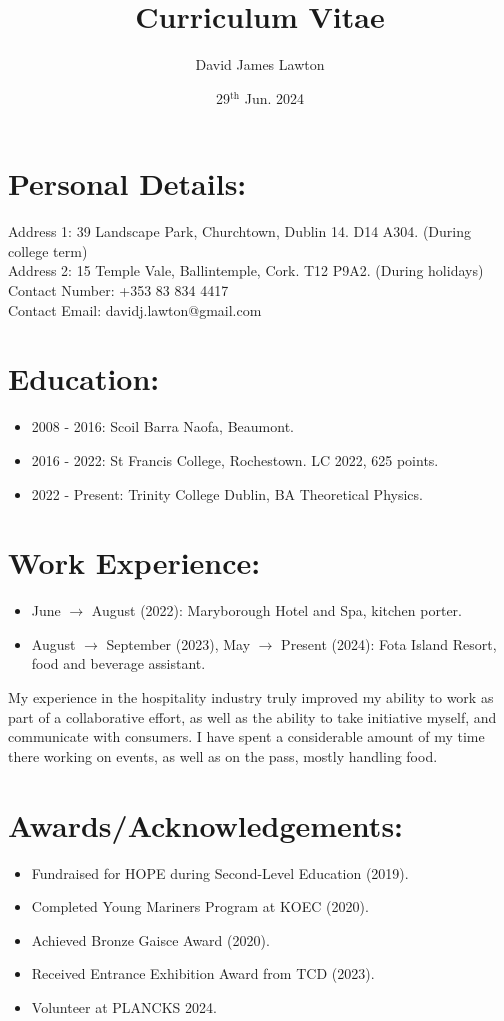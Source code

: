 \documentclass{article}
\title{Curriculum Vitae}
\author{David James Lawton}
\date{29$^\text{th}$ Jun. 2024}
\begin{document}
\maketitle

\section{Personal Details:}
Address 1: 39 Landscape Park, Churchtown, Dublin 14. D14 A304. (During college term)\\
Address 2: 15 Temple Vale, Ballintemple, Cork. T12 P9A2. (During holidays)\\
Contact Number: +353 83 834 4417\\
Contact Email: davidj.lawton@gmail.com\\

\section{Education:}
\begin{itemize}
\item 2008 - 2016: Scoil Barra Naofa, Beaumont.
\item 2016 - 2022: St Francis College, Rochestown. LC 2022, 625 points.
\item 2022 - Present: Trinity College Dublin, BA Theoretical Physics. 
\end{itemize}
\section{Work Experience:}
\begin{itemize}
\item June $\rightarrow$ August (2022): Maryborough Hotel and Spa, kitchen porter. 
\item August $\rightarrow$  September (2023), May $\rightarrow$ Present (2024): Fota Island Resort, food and beverage assistant.
\end{itemize}
My experience in the hospitality industry truly improved my ability to work as part of a collaborative effort, as well as the ability to take initiative myself, and communicate with consumers. I have spent a considerable amount of my time there working on events, as well as on the pass, mostly handling food.
\section{Awards/Acknowledgements:}
\begin{itemize}
\item Fundraised for HOPE during Second-Level Education (2019).
\item Completed Young Mariners Program at KOEC (2020).
\item Achieved Bronze Gaisce Award (2020).
\item Received Entrance Exhibition Award from TCD (2023).
\item Volunteer at PLANCKS 2024.
\end{itemize}
\end{document}
